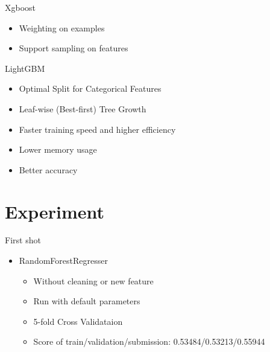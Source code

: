 \documentclass[
 size=12pt,
 paper=smartboard, %
 mode=present, %
 display=slides, %
style=tuliplab,
pauseslide,
fleqn,leqno]{powerdot}
\begin{document}
\begin{slide}{Xgboost}
  \begin{itemize}
    \item Weighting on examples
    \item Support sampling on features \pause
  \end{itemize}
\end{slide}

\begin{slide}{LightGBM}
  \begin{itemize}
    \item Optimal Split for Categorical Features \pause
    \item Leaf-wise (Best-first) Tree Growth \pause
    \item Faster training speed and higher efficiency \pause
    \item Lower memory usage \pause
    \item Better accuracy \pause
  \end{itemize}
\end{slide}


\section{Experiment}

\begin{slide}{First shot}
  \begin{itemize}
    \item RandomForestRegresser
    \begin{itemize}
      \item Without cleaning or new feature
      \item Run with default parameters
      \item 5-fold Cross Validataion
      \item Score of train/validation/submission: 0.53484/0.53213/0.55944
    \end{itemize}
  \end{itemize}
\end{slide}
\end{document}
